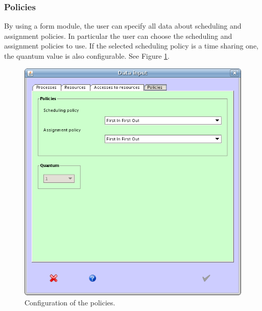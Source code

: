 \documentclass[10pt,a4paper,twoside,titlepage]{article}
\begin{document}
\subsubsection{Policies}
\label{subsubsec:policies}
By using a form module, the user can specify all data about scheduling and assignment policies. In particular the user can choose the scheduling and assignment policies to use. If the selected scheduling policy is a time sharing one, the quantum value is also configurable. See Figure \ref{fig:config_policies}.
\begin{figure}[tb]
	\begin{center}
		\includegraphics[scale=0.6]{config_policies}
		\caption[Configuration of the policies]{Configuration of the policies.}
		\label{fig:config_policies}
	\end{center}
\end{figure}
\end{document}
